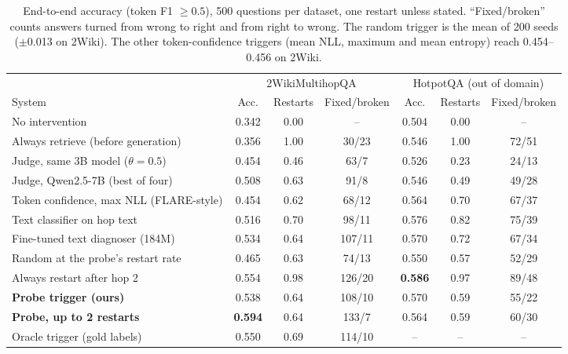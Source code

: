 \documentclass[11pt]{article}
\begin{document}
\begin{table}[t]
\centering\small
\begin{tabular}{lcccccc}
\toprule
 & \multicolumn{3}{c}{2WikiMultihopQA} & \multicolumn{3}{c}{HotpotQA (out of domain)} \\
\cmidrule(lr){2-4}\cmidrule(lr){5-7}
System & Acc. & Restarts & Fixed/broken & Acc. & Restarts & Fixed/broken \\
\midrule
No intervention & 0.342 & 0.00 & -- & 0.504 & 0.00 & -- \\
Always retrieve (before generation) & 0.356 & 1.00 & 30/23 & 0.546 & 1.00 & 72/51 \\
Judge, same 3B model ($\theta{=}0.5$) & 0.454 & 0.46 & 63/7 & 0.526 & 0.23 & 24/13 \\
Judge, Qwen2.5-7B (best of four) & 0.508 & 0.63 & 91/8 & 0.546 & 0.49 & 49/28 \\
Token confidence, max NLL (FLARE-style) & 0.454 & 0.62 & 68/12 & 0.564 & 0.70 & 67/37 \\
Text classifier on hop text & 0.516 & 0.70 & 98/11 & 0.576 & 0.82 & 75/39 \\
Fine-tuned text diagnoser (184M) & 0.534 & 0.64 & 107/11 & 0.570 & 0.72 & 67/34 \\
Random at the probe's restart rate & 0.465 & 0.63 & 74/13 & 0.550 & 0.57 & 52/29 \\
Always restart after hop 2 & 0.554 & 0.98 & 126/20 & \textbf{0.586} & 0.97 & 89/48 \\
\textbf{Probe trigger (ours)} & 0.538 & 0.64 & 108/10 & 0.570 & 0.59 & 55/22 \\
\textbf{Probe, up to 2 restarts} & \textbf{0.594} & 0.64 & 133/7 & 0.564 & 0.59 & 60/30 \\
Oracle trigger (gold labels) & 0.550 & 0.69 & 114/10 & -- & -- & -- \\
\bottomrule
\end{tabular}
\caption{End-to-end accuracy (token F1 $\geq 0.5$), 500 questions per dataset, one restart unless stated. ``Fixed/broken'' counts answers turned from wrong to right and from right to wrong. The random trigger is the mean of 200 seeds ($\pm$0.013 on 2Wiki). The other token-confidence triggers (mean NLL, maximum and mean entropy) reach 0.454--0.456 on 2Wiki.}
\label{tab:e2e}
\end{table}
\end{document}
